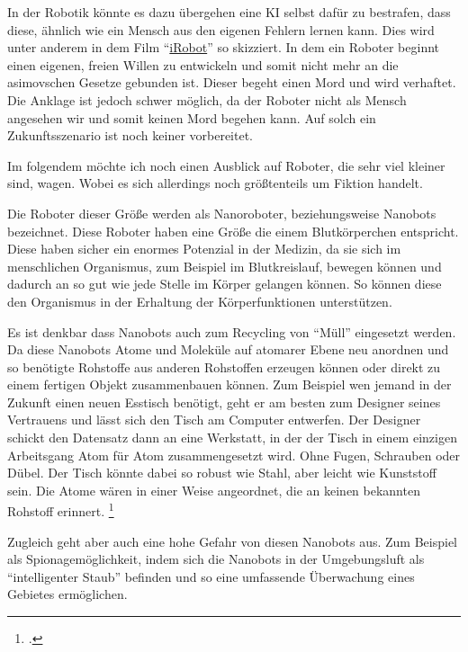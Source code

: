 In der Robotik könnte es dazu übergehen eine \ac{KI} selbst dafür zu
bestrafen, dass diese, ähnlich wie ein Mensch aus den eigenen Fehlern
lernen kann.
Dies wird unter anderem in dem Film
\enquote{\href{http://www.imdb.de/title/tt0343818/}{iRobot}} so skizziert.
In dem ein Roboter beginnt einen eigenen, freien Willen zu entwickeln
und somit nicht mehr an die asimovschen Gesetze gebunden ist.
Dieser begeht einen Mord und wird verhaftet.
Die Anklage ist jedoch schwer möglich, da der Roboter nicht als Mensch
angesehen wir und somit keinen Mord begehen kann.
Auf solch ein Zukunftsszenario ist noch keiner vorbereitet.

\bigskip
Im folgendem möchte ich noch einen Ausblick auf Roboter,
die sehr viel kleiner sind, wagen.
Wobei es sich allerdings noch größtenteils um Fiktion handelt.

Die Roboter dieser Größe werden als Nanoroboter,
beziehungsweise Nanobots bezeichnet.
Diese Roboter haben eine Größe die einem Blutkörperchen entspricht.
Diese haben sicher ein enormes Potenzial in der Medizin, da sie sich im menschlichen
Organismus, zum Beispiel im Blutkreislauf, bewegen können und dadurch an so
gut wie jede Stelle im Körper gelangen können.
So können diese den Organismus in der Erhaltung der Körperfunktionen unterstützen.

Es ist denkbar dass Nanobots auch zum Recycling von \enquote{Müll} eingesetzt werden.
Da diese Nanobots Atome und Moleküle auf atomarer Ebene neu
anordnen und so benötigte Rohstoffe aus anderen Rohstoffen erzeugen
können oder direkt zu einem fertigen Objekt zusammenbauen können.
Zum Beispiel wen jemand in der Zukunft einen neuen Esstisch benötigt,
geht er am besten zum Designer seines Vertrauens
und lässt sich den Tisch am Computer entwerfen.
Der Designer schickt den Datensatz dann an eine Werkstatt,
in der der Tisch in einem einzigen Arbeitsgang Atom für Atom zusammengesetzt wird.
Ohne Fugen, Schrauben oder Dübel.
Der Tisch könnte dabei so robust wie Stahl, aber leicht wie Kunststoff sein.
Die Atome wären in einer Weise angeordnet, die an keinen bekannten Rohstoff erinnert.
\footcite{Drexler:EnginesofCreation}

Zugleich geht aber auch eine hohe Gefahr von diesen Nanobots aus.
Zum Beispiel als Spionagemöglichkeit, indem sich die Nanobots in der Umgebungsluft
als \enquote{intelligenter Staub} befinden und so eine umfassende Überwachung
eines Gebietes ermöglichen.


